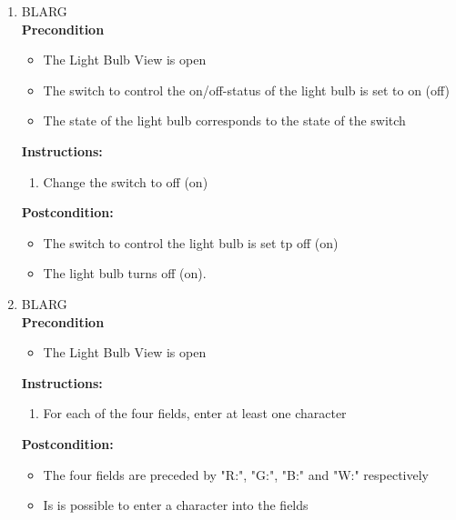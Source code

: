 \documentclass[a4paper]{article}
\newlength{\testlabellength}
\newenvironment{testlist}{\begin{enumerate}[label=\bfseries Instruction \thesubsection.\arabic* , labelindent=0pt, labelwidth=\testlabellength , leftmargin=2cm]}{\end{enumerate}}
\newenvironment{precondition}{
{\color{white}BLARG}\\ 
\textbf{Precondition}
\begin{itemize}[labelindent=0cm, labelwidth=2cm , leftmargin=1cm]
}
{\end{itemize}}
\newenvironment{instruction}{
\textbf{Instructions:}
\begin{enumerate}[label=\bfseries  \arabic*., labelindent=0cm, labelwidth=2cm , leftmargin=1cm]
}
{\end{enumerate}}
\newenvironment{postcondition}{
\textbf{Postcondition:}
\begin{itemize}[labelindent=0cm, labelwidth=2cm , leftmargin=1cm]
}
{\end{itemize}}
\begin{document}
\begin{appendices}
\begin{testlist}
	\item
		\begin{precondition}
			\item The Light Bulb View is open
			\item The switch to control the on/off-status of the light bulb is set to on (off)
			\item The state of the light bulb corresponds to the state of the switch
		\end{precondition}
    	\begin{instruction}
    		\item Change the switch to off (on)
    	\end{instruction}
    	\begin{postcondition}
    		\item The switch to control the light bulb is set tp off (on)
    		\item The light bulb turns off (on).
    	\end{postcondition}
    		
  
    
   	\item
   		\begin{precondition}
   			\item The Light Bulb View is open
		\end{precondition}
    	\begin{instruction}
    		\item For each of the four fields, enter at least one character
    	\end{instruction}
    	\begin{postcondition}
    		\item The four fields are preceded by "R:", "G:", "B:" and "W:" respectively
    		\item Is is possible to enter a character into the fields
    	\end{postcondition}

	

\end{testlist}
\end{appendices}
\end{document}
